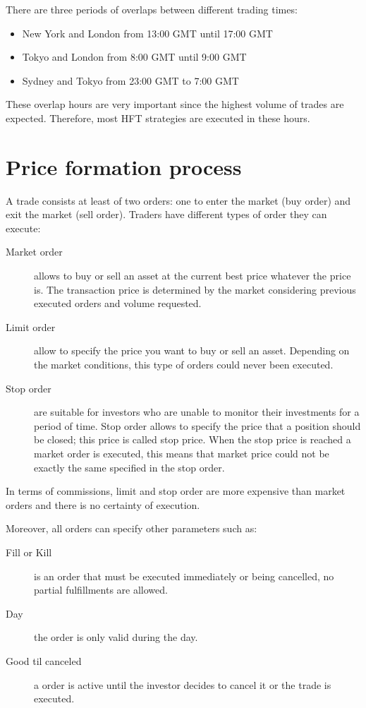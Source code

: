There are three periods of overlaps between different trading times:

\begin{itemize}
\item New York and London from 13:00 GMT until 17:00 GMT
\item Tokyo and London from 8:00 GMT until 9:00 GMT
\item Sydney and Tokyo from 23:00 GMT to 7:00 GMT 
\end{itemize}

These overlap hours are very important since the highest volume of trades are
expected. Therefore, most HFT strategies are executed in these hours.

\section{Price formation process}

A trade consists at least of two orders: one to enter the market (buy order) and
exit the market (sell order). Traders have different types of order they can
execute:

\begin{description}
\item[Market order] allows to buy or sell an asset at the current best price
whatever the price is. The transaction price is determined by the market
considering previous executed orders and volume requested.
\item[Limit order] allow to specify the price you want to buy or sell an asset.
Depending on the market conditions, this type of orders could never been executed.
\item[Stop order] are suitable for investors who are unable to monitor their
investments for a period of time. Stop order allows to specify the price that a
position should be closed; this price is called stop price. When the stop price
is reached a market order is executed, this means that market price could not be
exactly the same specified in the stop order.
\end{description}

In terms of commissions, limit and stop order are more expensive than market orders and
there is no certainty of execution.

Moreover, all orders can specify other parameters such as: 

\begin{description}
\item[Fill or Kill] is an order that must be executed immediately or being
cancelled, no partial fulfillments are allowed. 
\item[Day] the order is only valid during the day.
\item[Good til canceled] a order is active until the investor decides to cancel
it or the trade is executed.
\end{description}

